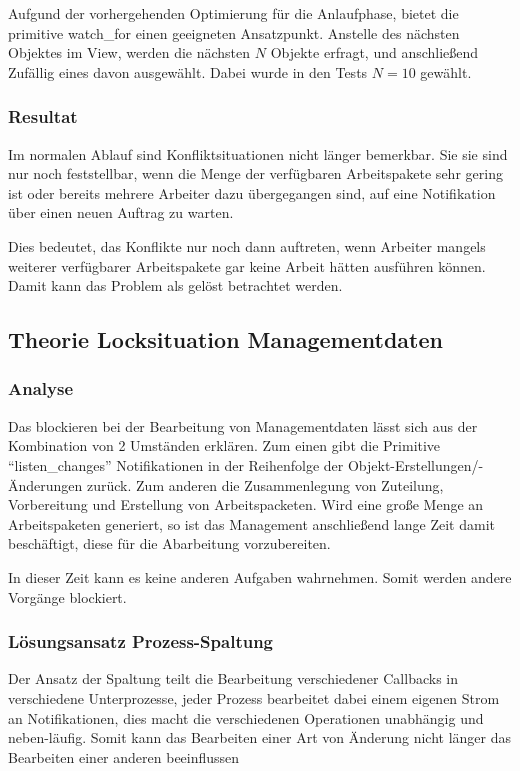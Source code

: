 Aufgund der vorhergehenden Optimierung für die Anlaufphase,
bietet die primitive watch\_for einen geeigneten Ansatzpunkt.
Anstelle des nächsten Objektes im View, werden die nächsten $N$ Objekte erfragt,
und anschließend Zufällig eines davon ausgewählt.
Dabei wurde in den Tests $N = 10$ gewählt.

\subsubsection{Resultat}
Im normalen Ablauf sind Konfliktsituationen nicht länger bemerkbar.
Sie sie sind nur noch feststellbar, wenn die Menge der verfügbaren Arbeitspakete
sehr gering ist oder bereits mehrere Arbeiter dazu übergegangen sind,
auf eine Notifikation über einen neuen Auftrag zu warten.

Dies bedeutet, das Konflikte nur noch dann auftreten,
wenn Arbeiter mangels weiterer verfügbarer Arbeitspakete gar keine
Arbeit hätten ausführen können. Damit kann das Problem als gelöst betrachtet werden.

\subsection{Theorie Locksituation Managementdaten}
\subsubsection{Analyse}
Das blockieren bei der Bearbeitung von Managementdaten lässt sich aus der Kombination von 2 Umständen erklären. Zum einen gibt die Primitive ``listen\_changes'' Notifikationen in der Reihenfolge der Objekt-Erstellungen/-Änderungen zurück.
Zum anderen die Zusammenlegung von Zuteilung, Vorbereitung und Erstellung von Arbeitspacketen.
Wird eine große Menge an Arbeitspaketen generiert,
so ist das Management anschließend lange Zeit damit beschäftigt,
diese für die Abarbeitung vorzubereiten.

In dieser Zeit kann es keine anderen Aufgaben wahrnehmen.
Somit werden andere Vorgänge blockiert.

\subsubsection{Lösungsansatz Prozess-Spaltung}

Der Ansatz der Spaltung teilt die Bearbeitung verschiedener Callbacks
in verschiedene Unterprozesse, jeder Prozess bearbeitet dabei einem eigenen Strom an Notifikationen, dies macht die verschiedenen Operationen unabhängig und neben-läufig.
Somit kann das Bearbeiten einer Art von Änderung nicht länger das Bearbeiten einer anderen beeinflussen 

